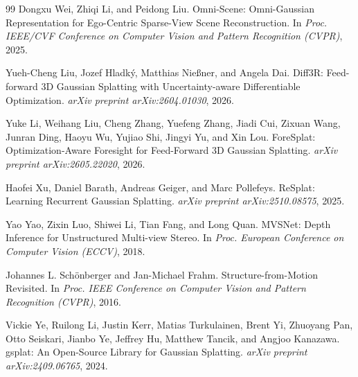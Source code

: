 \begin{thebibliography}{99}
Dongxu Wei, Zhiqi Li, and Peidong Liu.
\newblock Omni-Scene: Omni-Gaussian Representation for Ego-Centric Sparse-View Scene Reconstruction.
\newblock In \emph{Proc. IEEE/CVF Conference on Computer Vision and Pattern Recognition (CVPR)}, 2025.

Yueh-Cheng Liu, Jozef Hladk\'{y}, Matthias Nie{\ss}ner, and Angela Dai.
\newblock Diff3R: Feed-forward 3D Gaussian Splatting with Uncertainty-aware Differentiable Optimization.
\newblock \emph{arXiv preprint arXiv:2604.01030}, 2026.

Yuke Li, Weihang Liu, Cheng Zhang, Yuefeng Zhang, Jiadi Cui, Zixuan Wang, Junran Ding, Haoyu Wu, Yujiao Shi, Jingyi Yu, and Xin Lou.
\newblock ForeSplat: Optimization-Aware Foresight for Feed-Forward 3D Gaussian Splatting.
\newblock \emph{arXiv preprint arXiv:2605.22020}, 2026.

Haofei Xu, Daniel Barath, Andreas Geiger, and Marc Pollefeys.
\newblock ReSplat: Learning Recurrent Gaussian Splatting.
\newblock \emph{arXiv preprint arXiv:2510.08575}, 2025.

Yao Yao, Zixin Luo, Shiwei Li, Tian Fang, and Long Quan.
\newblock MVSNet: Depth Inference for Unstructured Multi-view Stereo.
\newblock In \emph{Proc. European Conference on Computer Vision (ECCV)}, 2018.

Johannes L. Sch\"onberger and Jan-Michael Frahm.
\newblock Structure-from-Motion Revisited.
\newblock In \emph{Proc. IEEE Conference on Computer Vision and Pattern Recognition (CVPR)}, 2016.

Vickie Ye, Ruilong Li, Justin Kerr, Matias Turkulainen, Brent Yi, Zhuoyang Pan, Otto Seiskari, Jianbo Ye, Jeffrey Hu, Matthew Tancik, and Angjoo Kanazawa.
\newblock gsplat: An Open-Source Library for Gaussian Splatting.
\newblock \emph{arXiv preprint arXiv:2409.06765}, 2024.


\end{thebibliography}
